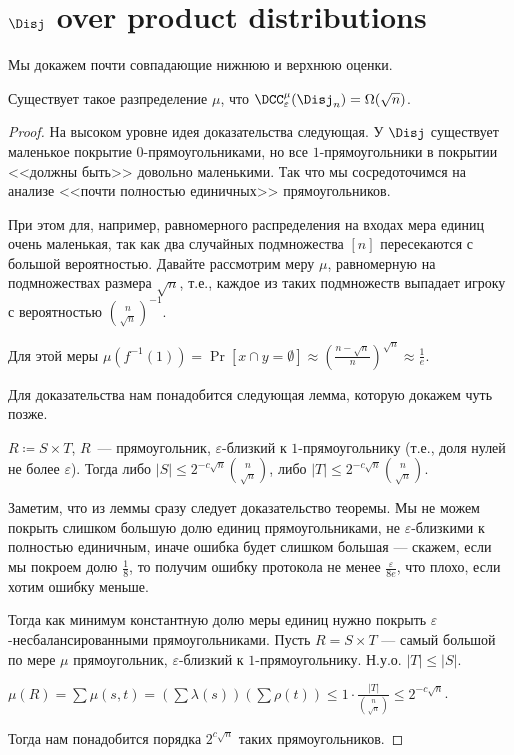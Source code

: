 \section{$\Disj$ over product distributions}

Мы докажем почти совпадающие нижнюю и верхнюю оценки.

\begin{theorem}
    Существует такое разпределение $\mu$, что $\DCC_{\varepsilon}^{\mu}(\Disj_n) = \Omega(\sqrt{n})$.
\end{theorem}

\begin{proof}
    На высоком уровне идея доказательства следующая. У $\Disj$ существует маленькое покрытие
    $0$-прямоугольниками, но все $1$-прямоугольники в покрытии <<должны быть>> довольно маленькими. Так
    что мы сосредоточимся на анализе <<почти полностью единичных>> прямоугольников.

    При этом для, например, равномерного распределения на входах мера единиц очень маленькая, так как два
    случайных подмножества $[n]$ пересекаются с большой вероятностью. Давайте рассмотрим меру $\mu$,
    равномерную на подмножествах размера $\sqrt{n}$, т.е., каждое из таких подмножеств выпадает игроку с
    вероятностью $\binom{n}{\sqrt{n}}^{-1}$.

    Для этой меры $\mu(f^{-1}(1)) = \Pr[x \cap y = \emptyset] \approx (\frac{n -
        \sqrt{n}}{n})^{\sqrt{n}} \approx \frac{1}{e}$.

    Для доказательства нам понадобится следующая лемма, которую докажем чуть позже.
    \begin{lemma}
        $R \coloneqq S \times T$, $R$~--- прямоугольник, $\varepsilon$-близкий к $1$-прямоугольнику
        (т.е., доля нулей не более $\varepsilon$). Тогда либо $|S| \leq 2^{-c\sqrt{n}}
        {{n}\choose{\sqrt{n}}}$, либо $|T| \leq 2^{-c\sqrt{n}} {{n}\choose{\sqrt{n}}}$.
    \end{lemma}

    Заметим, что из леммы сразу следует доказательство теоремы. Мы не можем покрыть слишком большую долю
    единиц прямоугольниками, не $\varepsilon$-близкими к полностью единичным, иначе ошибка будет слишком
    большая --- скажем, если мы покроем долю $\frac{1}{8}$, то получим ошибку протокола не менее
    $\frac{\varepsilon}{8e}$, что плохо, если хотим ошибку меньше.

    Тогда как минимум константную долю меры единиц нужно покрыть $\varepsilon$-несбалансированными
    прямоугольниками. Пусть $R = S \times T$ --- самый большой по мере $\mu$ прямоугольник,
    $\varepsilon$-близкий к $1$-прямоугольнику. Н.у.о. $|T| \leq |S|$.

    $\mu(R) = \sum \mu(s,t) = (\sum \lambda(s))(\sum \rho(t)) \leq 1 \cdot
    \frac{|T|}{{{n}\choose{\sqrt{n}}}} \leq 2^{-c\sqrt{n}}$.

    Тогда нам понадобится порядка $2^{c\sqrt{n}}$ таких прямоугольников.
\end{proof}


